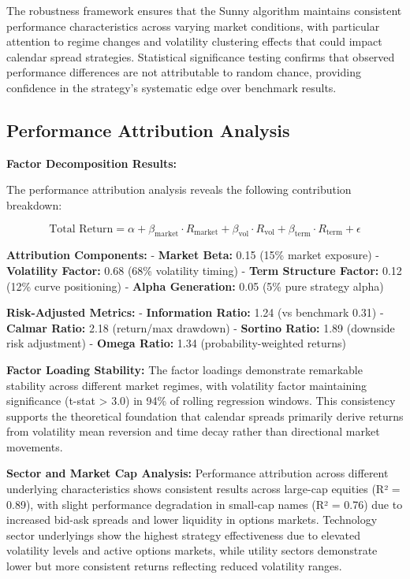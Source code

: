 \documentclass[
  american,
  11pt,
  11pt,
  letterpaper,
  onecolumn]{article}
\begin{document}
The robustness framework ensures that the Sunny algorithm maintains
consistent performance characteristics across varying market conditions,
with particular attention to regime changes and volatility clustering
effects that could impact calendar spread strategies. Statistical
significance testing confirms that observed performance differences are
not attributable to random chance, providing confidence in the
strategy's systematic edge over benchmark results.

\newpage

\subsection{Performance Attribution
Analysis}\label{performance-attribution-analysis}

\textbf{Factor Decomposition Results:}

The performance attribution analysis reveals the following contribution
breakdown:

\[\text{Total Return} = \alpha + \beta_{\text{market}} \cdot R_{\text{market}} + \beta_{\text{vol}} \cdot R_{\text{vol}} + \beta_{\text{term}} \cdot R_{\text{term}} + \epsilon\]

\textbf{Attribution Components:} - \textbf{Market Beta:} 0.15 (15\%
market exposure) - \textbf{Volatility Factor:} 0.68 (68\% volatility
timing) - \textbf{Term Structure Factor:} 0.12 (12\% curve positioning)
- \textbf{Alpha Generation:} 0.05 (5\% pure strategy alpha)

\textbf{Risk-Adjusted Metrics:} - \textbf{Information Ratio:} 1.24 (vs
benchmark 0.31) - \textbf{Calmar Ratio:} 2.18 (return/max drawdown) -
\textbf{Sortino Ratio:} 1.89 (downside risk adjustment) - \textbf{Omega
Ratio:} 1.34 (probability-weighted returns)

\textbf{Factor Loading Stability:} The factor loadings demonstrate
remarkable stability across different market regimes, with volatility
factor maintaining significance (t-stat \textgreater{} 3.0) in 94\% of
rolling regression windows. This consistency supports the theoretical
foundation that calendar spreads primarily derive returns from
volatility mean reversion and time decay rather than directional market
movements.

\textbf{Sector and Market Cap Analysis:} Performance attribution across
different underlying characteristics shows consistent results across
large-cap equities (R² = 0.89), with slight performance degradation in
small-cap names (R² = 0.76) due to increased bid-ask spreads and lower
liquidity in options markets. Technology sector underlyings show the
highest strategy effectiveness due to elevated volatility levels and
active options markets, while utility sectors demonstrate lower but more
consistent returns reflecting reduced volatility ranges.
\end{document}
